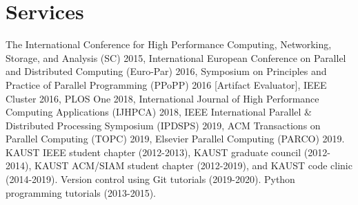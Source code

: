 \documentclass[10pt,a4paper]{moderncv}
\begin{document}
{{\section{Services}
{
  {
    The International Conference for High Performance Computing,
    Networking, Storage, and Analysis (SC) 2015,
    International European Conference on Parallel and
    Distributed Computing (Euro-Par) 2016,
    Symposium on Principles and Practice of Parallel Programming (PPoPP) 2016
    [Artifact Evaluator],
    IEEE Cluster 2016, PLOS One 2018,
    International Journal of High Performance Computing Applications (IJHPCA) 2018,
    IEEE International Parallel \& Distributed Processing Symposium (IPDSPS) 2019,
    ACM Transactions on Parallel Computing (TOPC) 2019,
    Elsevier Parallel Computing (PARCO) 2019.
  }
  {
    KAUST IEEE student chapter (2012-2013),
    KAUST graduate council (2012-2014),
    KAUST ACM/SIAM student chapter (2012-2019), and
    KAUST code clinic (2014-2019).
  }
  {
    Version control using Git tutorials (2019-2020).
  }
  {
    Python programming tutorials (2013-2015).
  }
}

}}
\end{document}
